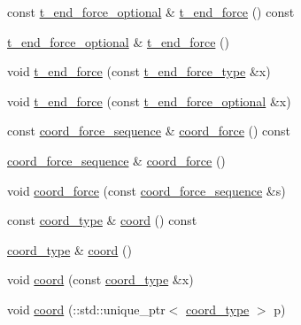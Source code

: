 \begin{DoxyCompactItemize}
\item 
const \hyperlink{classmembrane__t_a7725d61ae95e124d402a8d9db7a08376}{t\+\_\+end\+\_\+force\+\_\+optional} \& \hyperlink{classmembrane__t_ad3d07daa7aaa84cac85479dea684a281}{t\+\_\+end\+\_\+force} () const 
\item 
\hyperlink{classmembrane__t_a7725d61ae95e124d402a8d9db7a08376}{t\+\_\+end\+\_\+force\+\_\+optional} \& \hyperlink{classmembrane__t_a937765794f5b3841397d876dfe433e45}{t\+\_\+end\+\_\+force} ()
\item 
void \hyperlink{classmembrane__t_a9a35db0433da0b52cbe1c6a7d71cd064}{t\+\_\+end\+\_\+force} (const \hyperlink{classmembrane__t_a9c464d55e3d8162b6bb521d9dd6d761d}{t\+\_\+end\+\_\+force\+\_\+type} \&x)
\item 
void \hyperlink{classmembrane__t_aaec36e48218d3eb6503c623038621f06}{t\+\_\+end\+\_\+force} (const \hyperlink{classmembrane__t_a7725d61ae95e124d402a8d9db7a08376}{t\+\_\+end\+\_\+force\+\_\+optional} \&x)
\item 
const \hyperlink{classmembrane__t_a2825c9df8bf471f2c5053a826cf6fcb0}{coord\+\_\+force\+\_\+sequence} \& \hyperlink{classmembrane__t_a28c155d2af14f466f6cadd4ad2be09b6}{coord\+\_\+force} () const 
\item 
\hyperlink{classmembrane__t_a2825c9df8bf471f2c5053a826cf6fcb0}{coord\+\_\+force\+\_\+sequence} \& \hyperlink{classmembrane__t_a5ecc300d611f56ad4c4aef1963a891fd}{coord\+\_\+force} ()
\item 
void \hyperlink{classmembrane__t_a1500c28ae9c1483bfcfa922b1cd1f895}{coord\+\_\+force} (const \hyperlink{classmembrane__t_a2825c9df8bf471f2c5053a826cf6fcb0}{coord\+\_\+force\+\_\+sequence} \&s)
\item 
const \hyperlink{classmembrane__t_a0841f5bafc269d612a4b6fefcce1d73f}{coord\+\_\+type} \& \hyperlink{classmembrane__t_ae1af37f1ad61d584c7c937f714eb2143}{coord} () const 
\item 
\hyperlink{classmembrane__t_a0841f5bafc269d612a4b6fefcce1d73f}{coord\+\_\+type} \& \hyperlink{classmembrane__t_a3f3bba04ce2e3ef4377c22438aceffa3}{coord} ()
\item 
void \hyperlink{classmembrane__t_a371848cd38b967da540276a508738d14}{coord} (const \hyperlink{classmembrane__t_a0841f5bafc269d612a4b6fefcce1d73f}{coord\+\_\+type} \&x)
\item 
void \hyperlink{classmembrane__t_a82711d526f1a5be0f38d0158adb1f977}{coord} (\+::std\+::unique\+\_\+ptr$<$ \hyperlink{classmembrane__t_a0841f5bafc269d612a4b6fefcce1d73f}{coord\+\_\+type} $>$ p)
\item 

\end{DoxyCompactItemize}
